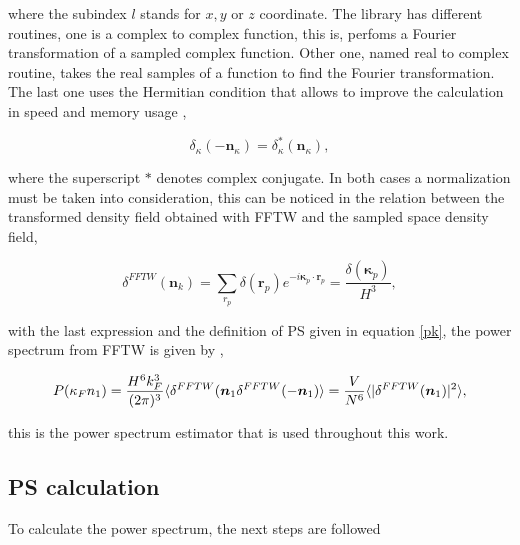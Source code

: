 where the subindex $l$ stands for $x,y$ or $z$ coordinate. 
The library has different routines, one is a complex to complex function, this is, perfoms a 
Fourier transformation of a sampled complex function. Other one, named real to complex routine, 
takes the real samples of a function to find the Fourier transformation. The last one 
uses the Hermitian condition that allows to improve the calculation in speed and memory 
usage \cite{Jing},

\[\delta_\kappa(-\textbf{n}_\kappa) = \delta_\kappa^*(\textbf{n}_\kappa),\]

where the superscript $*$ denotes complex conjugate. In both cases a normalization 
must be taken into consideration, this can be noticed in the relation between the transformed 
density field obtained with FFTW and the sampled space density field, 

\[\delta^{FFTW}(\textbf{n}_k) = \sum_{r_p} \delta(\textbf{r}_p)e^{-i\boldsymbol{\kappa}_p\cdot \boldsymbol{r}_p} = \frac{\delta(\boldsymbol{\kappa}_p)}{H^3},\]

with the last expression and the definition of PS given in equation \ref{pk}, the power
spectrum from FFTW is given by \cite{Djeong},

\begin{equation}
P(\kappa_F n_1) = \frac{H^6 k^3_F}{(2\pi)^3}\langle\delta^{FFTW}(\mbox{\boldmath$n$}_1\delta^{FFTW}(-\mbox{\boldmath$n$}_1)\rangle = \frac{V}{N^6}\langle|\delta^{FFTW}(\mbox{\boldmath$n$}_1)|^2\rangle ,
\end{equation} 

this is the power spectrum estimator that is used throughout this work. 

\subsection{PS calculation}

To calculate the power spectrum, the next steps are followed


